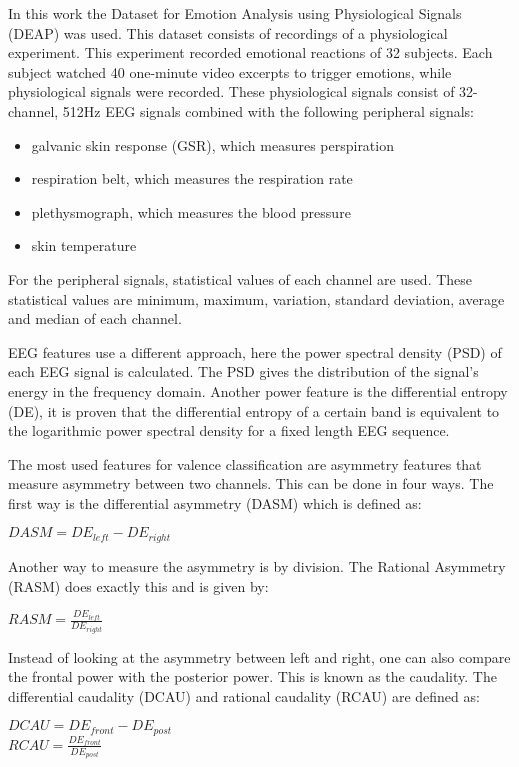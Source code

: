 \documentclass[11pt,journal,compsoc]{IEEEtran}
\newcommand{\npar}{\par \vspace{2.3ex plus 0.3ex minus 0.3ex}}
\begin{document}
In this work the Dataset for Emotion Analysis using Physiological Signals (DEAP) was used. This dataset consists of recordings of a physiological experiment\citep{DEAP}. This experiment recorded emotional reactions of 32 subjects. Each subject watched 40 one-minute video excerpts to trigger emotions, while physiological signals were recorded. These physiological signals consist of 32-channel, 512Hz EEG signals combined with the following peripheral signals:
\begin{itemize}
\item galvanic skin response (GSR), which measures perspiration
\item respiration belt, which measures the respiration rate
\item plethysmograph, which measures the blood pressure
\item skin temperature
\end{itemize}
For the peripheral signals, statistical values of each channel are used. These statistical values are minimum, maximum, variation, standard deviation, average and median of each channel. 

\npar

EEG features use a different approach, here the power spectral density (PSD) of each EEG signal is calculated. The PSD gives the distribution of the signal's energy in the frequency domain. Another power feature is the differential entropy (DE), it is proven that the differential entropy of a certain band is equivalent to the logarithmic power spectral density for a fixed length EEG sequence\citep{killyPaper}.

\npar

The most used features for valence classification are asymmetry features that measure asymmetry between two channels\cite{GivenPaper}. This can be done in four ways. The first way is the differential asymmetry (DASM) which is defined as:

\begin{center}
$DASM = DE_{left} - DE_{right}$
\end{center}

Another way to measure the asymmetry is by division. The Rational Asymmetry (RASM) does exactly this and is given by:

\begin{center}
$RASM = \frac{DE_{left}}{DE_{right}}$
\end{center}

Instead of looking at the asymmetry between left and right, one can also compare the frontal power with the posterior power\cite{GivenPaper}. This is known as the caudality. The differential caudality (DCAU) and rational caudality (RCAU) are defined as:
\begin{center}
$DCAU = DE_{front} - DE_{post}$ \\
$RCAU = \frac{DE_{front}}{DE_{post}}$
\end{center}
\end{document}
